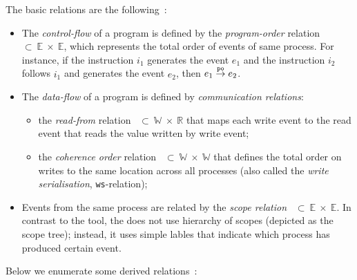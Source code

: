 \vspace{1em}
The basic relations are the following~\cite{alglave2010shared}:
\begin{itemize}
    \item The \textit{control-flow} of a program is defined by the \textit{program-order} relation \po~$\subset~\mathbb{E}~\times~\mathbb{E}$, which represents the total order of events of same process.
    For instance, if the instruction $i_1$ generates the event $e_1$ and the instruction $i_2$ follows $i_1$ and generates the event $e_2$, then $e_1 \overset{\mathtt{po}}{\rightarrow} e_2$.

    \item The \textit{data-flow} of a program is defined by \textit{communication relations}:
        \begin{itemize}[noitemsep]
            \item the \textit{read-from} relation \rf~$\subset~\mathbb{W}~\times~\mathbb{R}$ that maps each write event to the read event that reads the value written by write event;
            \item the \textit{coherence order} relation \co~$\subset~\mathbb{W}~\times~\mathbb{W}$ that defines the total order on writes to the same location across all processes (also called the \textit{write serialisation}, \texttt{ws}-relation);
        \end{itemize}

    \item Events from the same process are related by the \textit{scope relation} \sr~$\subset~\mathbb{E}~\times~\mathbb{E}$.
    In contrast to the  tool, the \porthos[2] does not use hierarchy of scopes (depicted as the scope tree); instead, it uses simple lables that indicate which process has produced certain event.
\end{itemize}


Below we enumerate some derived relations~\cite{alglave2010shared}:

